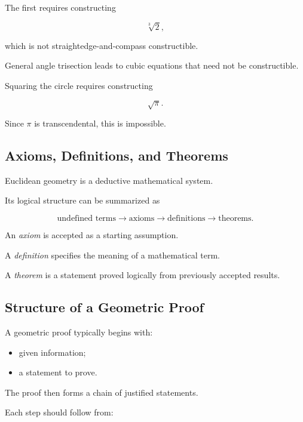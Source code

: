 The first requires constructing

\[ \sqrt[3]{2}, \]

which is not straightedge-and-compass constructible.

General angle trisection leads to cubic equations that need not be
constructible.

Squaring the circle requires constructing

\[ \sqrt{\pi}. \]

Since \(\pi\) is transcendental, this is impossible.

\subsection{Axioms, Definitions, and Theorems}
\label{subsec:geometry-axioms-definitions-theorems}

Euclidean geometry is a deductive mathematical system.

Its logical structure can be summarized as

\[
\boxed{
\text{undefined terms}
\longrightarrow
\text{axioms}
\longrightarrow
\text{definitions}
\longrightarrow
\text{theorems}.
}
\]

An \emph{axiom} is accepted as a starting assumption.

A \emph{definition} specifies the meaning of a mathematical term.

A \emph{theorem} is a statement proved logically from previously accepted
results.

\subsection{Structure of a Geometric Proof}
\label{subsec:geometric-proof-structure}

A geometric proof typically begins with:

\begin{itemize}
    \item given information;
    \item a statement to prove.
\end{itemize}

The proof then forms a chain of justified statements.

Each step should follow from:

